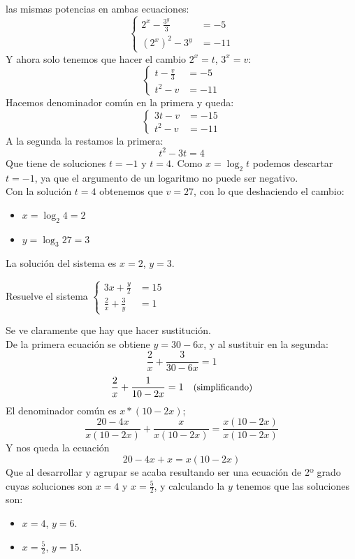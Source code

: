 \documentclass[a4paper,11pt,answers]{exam}
\begin{document}
\begin{questions}
\begin{solution}
      las mismas potencias en ambas ecuaciones:
      \[
        \begin{cases}
          2^x - \frac{3^y}{3} &=-5\\
          \left(2^x\right)^2 - 3^y &=-11
        \end{cases}
      \]
      Y ahora solo tenemos que hacer el cambio $2^x = t$, $3^x = v$:
      \[
        \begin{cases}
          t - \frac{v}{3} &=-5\\
          t^2 - v &=-11
        \end{cases}
      \]
      Hacemos denominador común en la primera y queda:
      \[
        \begin{cases}
          3t - v &=-15\\
          t^2 - v &=-11
        \end{cases}
      \]
      A la segunda la restamos la primera:
      \[t^2 - 3t = 4\]
      Que tiene de soluciones $t = -1$ y $t= 4$. Como $x = \log_2 t$ podemos descartar $t = -1$,
      ya que el argumento de un logaritmo no puede ser negativo.\\
      Con la solución $t = 4$ obtenemos que $v = 27$, con lo que deshaciendo el cambio:
      \begin{itemize}
      \item $x = \log_2 4= 2$
      \item $y = \log_3 27 = 3$
      \end{itemize}
      La solución del sistema es $x=2$, $y = 3$.
    \end{solution}
  \question Resuelve el sistema $
    \begin{cases}
      3x + \frac{y}{2} &= 15\\
      \frac{2}{x} + \frac{3}{y} &=1
    \end{cases}$
    \begin{solution}
      Se ve claramente que hay que hacer sustitución.\\
      
      De la primera ecuación se obtiene $y = 30 - 6x$, y al sustituir en la segunda:
      \[\frac{2}{x} + \frac{3}{30 - 6x} = 1\]
      \[\frac{2}{x} + \frac{1}{10-2x} = 1\quad \text{\small{(simplificando)}}\]
      El denominador común es $x*(10 - 2x)$;
      \[\frac{20 - 4x}{x(10-2x)} + \frac{x}{x(10-2x)} = \frac{x(10-2x)}{x(10-2x)}\]
      Y nos queda la ecuación
      \[20 - 4x + x = x(10 - 2x)\]
      Que al desarrollar y agrupar se acaba resultando ser una ecuación de 2º grado cuyas
      soluciones son $x=4$ y $x = \frac{5}{2}$, y calculando la $y$ tenemos que las soluciones son:
      \begin{itemize}
      \item $x = 4$, $y = 6$.
      \item $x = \frac{5}{2}$, $y = 15$.
      \end{itemize}
    \end{solution}
  \end{questions}
\end{document}
